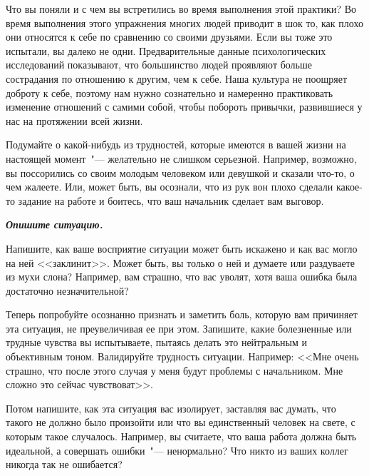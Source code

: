 Что вы поняли и с чем вы встретились во время выполнения этой практики?
Во время выполнения этого упражнения многих людей приводит в шок то, как плохо они относятся к себе по сравнению со своими друзьями. Если вы тоже это испытали, вы далеко не одни. Предварительные данные психологических исследований показывают, что большинство людей проявляют больше сострадания по отношению к другим, чем к себе. Наша культура не поощряет доброту к себе, поэтому нам нужно сознательно и намеренно практиковать изменение отношений с самими собой, чтобы побороть привычки, развившиеся у нас на протяжении всей жизни.


\newpage



Подумайте о какой-нибудь из трудностей, которые имеются в вашей жизни на настоящей момент~"--- желательно не слишком серьезной. Например, возможно, вы поссорились со своим молодым человеком или девушкой и сказали что-то, о чем жалеете. Или, может быть, вы осознали, что из рук вон плохо сделали какое-то задание на работе и боитесь, что ваш начальник сделает вам выговор.

\vspace{2ex}

\textbf{\textit{Опишите ситуацию.}}

\vfill

Напишите, как ваше восприятие ситуации может быть искажено и как вас могло на ней <<заклинит>>. Может быть, вы только о ней и думаете или раздуваете из мухи слона? Например, вам страшно, что вас уволят, хотя ваша ошибка была достаточно незначительной?

\vfill


\newpage


Теперь попробуйте осознанно признать и заметить боль, которую вам причиняет эта ситуация, не преувеличивая ее при этом. Запишите, какие болезненные или трудные чувства вы испытываете, пытаясь делать это нейтральным и объективным тоном. Валидируйте трудность ситуации. Например: <<Мне очень страшно, что после этого случая у меня будут проблемы с начальником.  Мне сложно это сейчас чувствоват>>.

\vfill

Потом напишите, как эта ситуация вас изолирует, заставляя вас думать, что такого не должно было произойти или что вы единственный человек на свете, с которым такое случалось. Например, вы считаете, что ваша работа должна быть идеальной, а совершать ошибки~"--- ненормально? Что никто из ваших коллег никогда так не ошибается?

